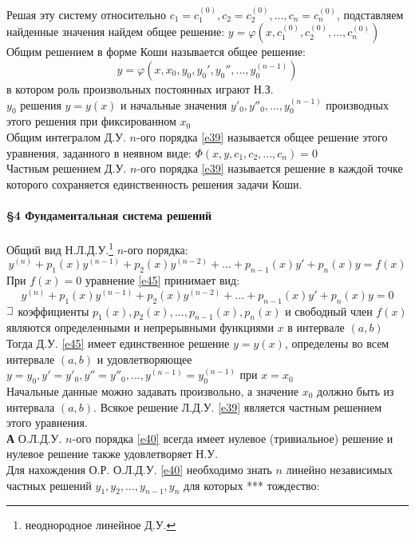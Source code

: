 \documentclass{article}
\numberwithin{equation}{section}
\def\letus{%
    \mathord{\setbox0=\hbox{$\exists$}%
             \hbox{\kern 0.125\wd0%
                   \vbox to \ht0{%
                      \hrule width 0.75\wd0%
                      \vfill%
                      \hrule width 0.75\wd0}%
                   \vrule height \ht0%
                   \kern 0.125\wd0}%
           }%
}
\begin{document}
Решая эту систему относительно $c_1=c_1^{(0)},c_2=c_2^{(0)},...,c_n=c_n^{(0)}$, подставляем найденные значения найдем общее решение: $y=\varphi(x,c_1^{(0)},c_2^{(0)},...,c_n^{(0)})$\\
Общим решением в форме Коши называется общее решение:
\begin{equation}\label{e44}
y=\varphi(x,x_0,y_0,y_0',y_0'',...,y_0^{(n-1)})
\end{equation}
в котором роль произвольных постоянных играют Н.З.\\
$y_0$ решения $y=y(x)$ и начальные значения $y'_0,y''_0,...,y_0^{(n-1)}$ производных этого решения при фиксированном $x_0$\\
Общим интегралом Д.У. $n$-ого порядка \eqref{e39} называется общее решение этого уравнения, заданного в неявном виде: $\varPhi(x,y,c_1,c_2,...,c_n)=0$\\
Частным решением Д.У. $n$-ого порядка \eqref{e39} называется решение в каждой точке которого сохраняется единственность решения задачи Коши.
\\\\
\textbf{\large{\S4 Фундаментальная система решений}}
\\\\
Общий вид Н.Л.Д.У.\footnote{неоднородное линейное Д.У.} $n$-ого порядка:
\begin{equation}\label{e45}
y^{(n)}+p_1(x)y^{(n-1)}+p_2(x)y^{(n-2)}+...+p_{n-1}(x)y'+p_n(x)y=f(x)
\end{equation}
При $f(x)=0$ уравнение \eqref{e45} принимает вид:
\begin{equation}\label{e46}
y^{(n)}+p_1(x)y^{(n-1)}+p_2(x)y^{(n-2)}+...+p_{n-1}(x)y'+p_n(x)y=0
\end{equation}
$\letus$ коэффициенты $p_1(x),p_2(x),...,p_{n-1}(x),p_n(x)$ и свободный член $f(x)$ являются определенными и непрерывными функциями $x$ в интервале $(a,b)$\\
Тогда Д.У. \eqref{e45} имеет единственное решение $y=y(x)$, определены во всем интервале $(a,b)$ и удовлетворяющее $y=y_0,y'=y'_0,y''=y''_0,...,y^{(n-1)}=y^{(n-1)}_0$ при $x=x_0$\\
Начальные данные можно задавать произвольно, а значение $x_0$ должно быть из интервала $(a,b)$. Всякое решение Л.Д.У. \eqref{e39} является частным решением этого уравнения.\\
\textbf{А} О.Л.Д.У. $n$-ого порядка \eqref{e40} всегда имеет нулевое (тривиальное) решение и нулевое решение также удовлетворяет Н.У.\\
Для нахождения О.Р. О.Л.Д.У. \eqref{e40} необходимо знать $n$ линейно независимых частных решений $y_1,y_2,...,y_{n-1},y_n$ для которых \colorbox{red!50}{***} тождество:
\end{document}
